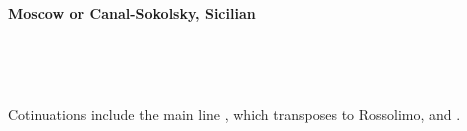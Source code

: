 \begin{center}\textbf{Moscow or Canal-Sokolsky, Sicilian}\\\end{center}
\newgame
{}\\
\notationoff
\begin{center}\showboard\\\end{center}
Cotinuations include the main line ,  which transposes to Rossolimo, and .
